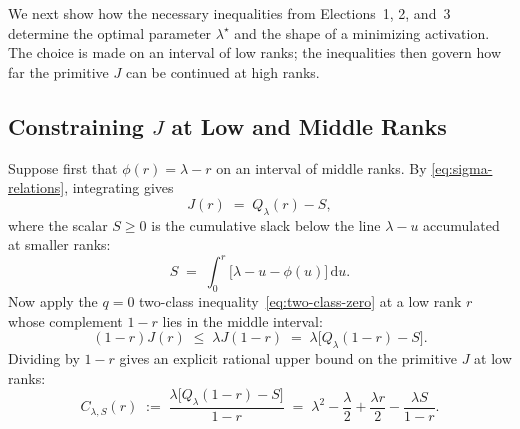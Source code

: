 \documentclass[11pt]{article}
\numberwithin{equation}{section}
\theoremstyle{plain}
\theoremstyle{definition}
\newcommand{\1}{\mathbf{1}}
\begin{document}
We next show how the necessary inequalities from Elections~1, 2, and~3 determine the optimal parameter $\lambda^\star$ and the shape of a minimizing activation. The choice is made on an interval of low ranks; the inequalities then govern how far the primitive $J$ can be continued at high ranks.

\subsection{Constraining \texorpdfstring{$J$}{J} at Low and Middle Ranks}
\label{sec:low-ranks}

Suppose first that $\phi(r) = \lambda - r$ on an interval of middle ranks. By \cref{eq:sigma-relations}, integrating gives
\[
  J(r) \;=\; Q_\lambda(r) - S,
\]
where the scalar $S \ge 0$ is the cumulative slack below the line $\lambda - u$ accumulated at smaller ranks:
\[
  S \;=\; \int_0^r \bigl[\lambda - u - \phi(u)\bigr]\,\mathrm{d}u.
\]
Now apply the $q = 0$ two-class inequality~\eqref{eq:two-class-zero} at a low rank $r$ whose complement $1 - r$ lies in the middle interval:
\[
  (1 - r)J(r) \;\le\; \lambda J(1 - r) \;=\; \lambda\bigl[Q_\lambda(1 - r) - S\bigr].
\]
Dividing by $1 - r$ gives an explicit rational upper bound on the primitive $J$ at low ranks:
\[
  C_{\lambda, S}(r) \;:=\; \frac{\lambda\bigl[Q_\lambda(1 - r) - S\bigr]}{1 - r}
  \;=\; \lambda^2 - \frac{\lambda}{2} + \frac{\lambda r}{2} - \frac{\lambda S}{1 - r}.
\]
\end{document}
